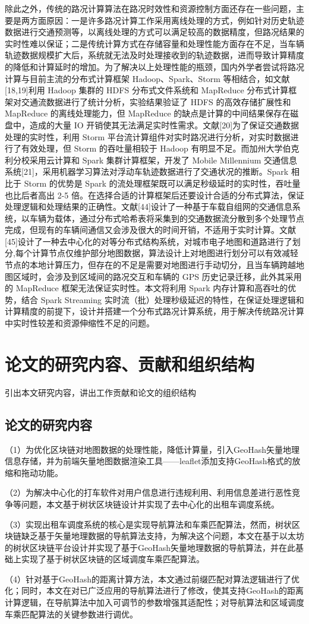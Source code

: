 除此之外，传统的路况计算算法在路况时效性和资源控制方面还存在一些问题，主要是两方面原因：一是许多路况计算工作采用离线处理的方式，例如针对历史轨迹数据进行交通预测等，以离线处理的方式可以满足较高的数据精度，但路况结果的实时性难以保证；二是传统计算方式在存储容量和处理性能方面存在不足，当车辆轨迹数据规模扩大后，系统就无法及时处理接收到的轨迹数据，进而导致计算精度的降低和计算延时的增加。为了解决以上处理性能的瓶颈，国内外学者尝试将路况计算与目前主流的分布式计算框架 Hadoop、Spark、Storm 等相结合，如文献[18,19]利用 Hadoop 集群的 HDFS 分布式文件系统和 MapReduce 分布式计算框架对交通流数据进行了统计分析，实验结果验证了 HDFS 的高效存储扩展性和 MapReduce 的离线处理能力，但 MapReduce 的缺点是计算的中间结果保存在磁盘中，造成的大量 IO 开销使其无法满足实时性需求。文献[20]为了保证交通数据处理的实时性，利用 Storm 平台流计算组件对实时路况进行分析，对实时数据进行了有效处理，但 Storm 的吞吐量相较于 Hadoop 有明显不足。而加州大学伯克利分校采用云计算和 Spark 集群计算框架，开发了 Mobile Millennium 交通信息系统[21]，采用机器学习算法对浮动车轨迹数据进行了交通状况的推断。Spark 相比于 Storm 的优势是 Spark 的流处理框架既可以满足秒级延时的实时性，吞吐量也比后者高出 2-5 倍。在选择合适的计算框架后还要设计合适的分布式算法，保证处理逻辑和处理结果的正确性。文献[44]设计了一种基于车载自组网的交通信息系统，以车辆为载体，通过分布式哈希表将采集到的交通数据流分散到多个处理节点完成，但现有的车辆间通信又会涉及很大的时间开销，不适用于实时计算。文献[45]设计了一种去中心化的对等分布式结构系统，对城市电子地图和道路进行了划分,每个计算节点仅维护部分地图数据，算法设计上对地图进行划分可以有效减轻节点的本地计算压力，但存在的不足是需要对地图进行手动切分，且当车辆跨越地图区域时，会涉及到区域间的路况交互和车辆的 GPS 历史记录迁移，此外其采用的 MapReduce 框架无法保证实时性。本文将利用 Spark 内存计算和高吞吐的优势，结合 Spark Streaming 实时流（批）处理秒级延迟的特性，在保证处理逻辑和计算精度的前提下，设计并搭建一个分布式路况计算系统，用于解决传统路况计算中实时性较差和资源伸缩性不足的问题。
\section{论文的研究内容、贡献和组织结构}
引出本文研究内容，讲出工作贡献和论文的组织结构
\subsection{论文的研究内容}
（1）为优化区块链对地图数据的处理性能，降低计算量，引入GeoHash矢量地理信息存储，并为前端矢量地图数据渲染工具——leaflet添加支持GeoHash格式的放缩和拖动功能。\par
（2）为解决中心化的打车软件对用户信息进行违规利用、利用信息差进行恶性竞争等问题，本文基于树状区块链设计并实现了去中心化的出租车调度系统。\par
（3）实现出租车调度系统的核心是实现导航算法和车乘匹配算法，然而，树状区块链缺乏基于矢量地理数据的导航算法支持，为解决这个问题，本文在基于以太坊的树状区块链平台设计并实现了基于GeoHash矢量地理数据的导航算法，并在此基础上实现了基于树状区块链的区域调度车乘匹配算法。\par
（4）针对基于GeoHash的距离计算方法，本文通过前缀匹配对算法逻辑进行了优化；同时，本文在对已广泛应用的导航算法进行了修改，使其支持GeoHash的距离计算逻辑，在导航算法中加入可调节的参数增强其适配性；对导航算法和区域调度车乘匹配算法的关键参数进行调优。
